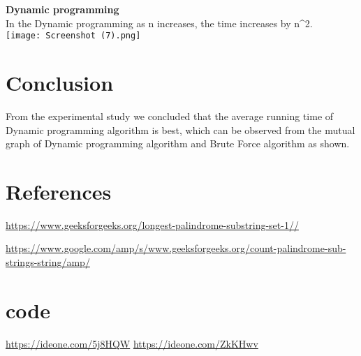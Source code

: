 \documentclass[12pt, a4paper]{report}
\begin{document}
\begin{multicols}{2}
\textbf{Dynamic programming}\\
In the Dynamic programming as n increases, the time increases by n^2.\\

\texttt{[image: Screenshot (7).png]}

\section{Conclusion}
From the experimental study we concluded that the average running time of Dynamic programming algorithm is best,  which can be observed from the mutual graph of Dynamic programming algorithm and Brute Force algorithm as shown.


\section{References}

\url{https://www.geeksforgeeks.org/longest-palindrome-substring-set-1//}

\url{https://www.google.com/amp/s/www.geeksforgeeks.org/count-palindrome-sub-strings-string/amp/}

\section{code}

\url{https://ideone.com/5j8HQW}
\url{https://ideone.com/ZkKHwv}



\end{multicols}
\end{document}
